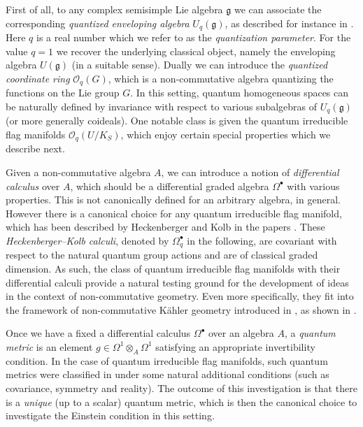\documentclass[a4paper,12pt,reqno,english]{amsart}
\numberwithin{equation}{section}
\numberwithin{figure}{section}
\theoremstyle{plain}
\theoremstyle{plain}
\theoremstyle{plain}
\theoremstyle{plain}
\theoremstyle{plain}
\theoremstyle{definition}
\theoremstyle{definition}
\theoremstyle{definition}
\theoremstyle{remark}
\theoremstyle{definition}
\newcommand{\lieg}{\mathfrak{g}}
\newcommand{\Uqg}{U_q(\mathfrak{g})}
\newcommand{\OqG}{\mathcal{O}_q(G)}
\newcommand{\Oqflag}{\mathcal{O}_q(U / K_S)}
\newcommand{\diffcalc}{\Omega_q}
\begin{document}
First of all, to any complex semisimple Lie algebra $\lieg$ we can associate the corresponding \emph{quantized enveloping algebra} $\Uqg$, as described for instance in \cite{klsc}.
Here $q$ is a real number which we refer to as the \emph{quantization parameter}. For the value $q = 1$ we recover the underlying classical object, namely the enveloping algebra $U(\lieg)$ (in a suitable sense).
Dually we can introduce the \emph{quantized coordinate ring} $\OqG$, which is a non-commutative algebra quantizing the functions on the Lie group $G$.
In this setting, quantum homogeneous spaces can be naturally defined by invariance with respect to various subalgebras of $\Uqg$ (or more generally coideals).
One notable class is given the quantum irreducible flag manifolds $\Oqflag$, which enjoy certain special properties which we describe next.

Given a non-commutative algebra $A$, we can introduce a notion of \emph{differential calculus} over $A$, which should be a differential graded algebra $\Omega^\bullet$ with various properties.
This is not canonically defined for an arbitrary algebra, in general.
However there is a canonical choice for any quantum irreducible flag manifold, which has been described by Heckenberger and Kolb in the papers \cite{locally-finite, heko}.
These \emph{Heckenberger--Kolb calculi}, denoted by $\diffcalc^\bullet$ in the following, are covariant with respect to the natural quantum group actions and are of classical graded dimension.
As such, the class of quantum irreducible flag manifolds with their differential calculi provide a natural testing ground for the development of ideas in the context of non-commutative geometry.
Even more specifically, they fit into the framework of non-commutative Kähler geometry introduced in \cite{kahler-structures}, as shown in \cite{kahler}.

Once we have a fixed a differential calculus $\Omega^\bullet$ over an algebra $A$, a \emph{quantum metric} is an element $g \in \Omega^1 \otimes_A \Omega^1$ satisfying an appropriate invertibility condition.
In the case of quantum irreducible flag manifolds, such quantum metrics were classified in \cite{levicivita-irreducible} under some natural additional conditions (such as covariance, symmetry and reality).
The outcome of this investigation is that there is a \emph{unique} (up to a scalar) quantum metric, which is then the canonical choice to investigate the Einstein condition in this setting.
\end{document}
